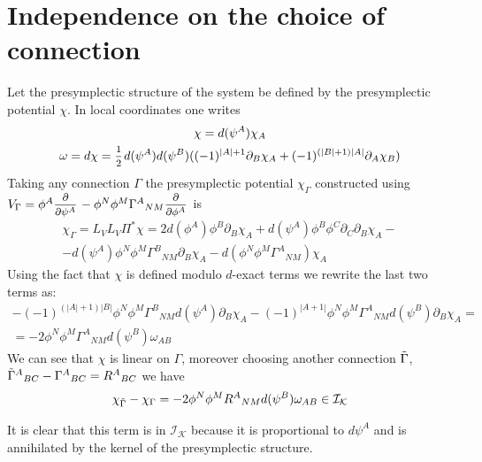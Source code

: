 \documentclass[a4paper,12pt]{article}
\numberwithin{equation}{section} %
\renewcommand{\d}{\partial}
\newcommand{\half}{\mathchoice{%
    \ffrac{1}{2}}{\frac{1}{2}}{\frac{1}{2}}{\frac{1}{2}}}
\newcommand{\ffrac}[2]{\raisebox{.5pt}%
  {\footnotesize$\displaystyle\frac{#1}{#2}$}\kern1pt}
\newcommand{\ddl}[2]{\ffrac{\d #1}{\d #2}}
\def\cI{\mathcal{I}}
\def\cK{\mathcal{K}}
\begin{document}
\section{Independence on the choice of connection}\label{App:Linearization}
Let the presymplectic structure of the system be defined by the presymplectic potential $\chi$. In local coordinates one writes 
\begin{equation}
\begin{gathered}
    \chi = d(\psi^A)\chi_A \\
    \omega = d\chi = \half d(\psi^A)d(\psi^B)((-1)^{|A|+1}\partial_B \chi_A + (-1)^{(|B|+1)|A|}\partial_A \chi_B)
\end{gathered}
\end{equation}
Taking any connection $\Gamma$ the presymplectic potential $\chi_{\Gamma}$ constructed using $V_\Gamma = \phi^A \ddl{}{\psi^A} - \phi^N \phi^M \Gamma^A{}_{NM}\ddl{}{\phi^A}$ is 
\begin{equation}
\begin{gathered}
    \chi_\Gamma = L_V L_V \Pi^* \chi = 2 d(\phi^A) \phi^B \partial_B\chi_A  + d(\psi^A) \phi^B \phi^C \partial_C \partial_B \chi_A  - \\ - d(\psi^A) \phi^N \phi^M \Gamma^B{}_{NM} \partial_B \chi_A - d(\phi^N \phi^M \Gamma^A{}_{NM}) \chi_A 
\end{gathered}
\end{equation}
Using the fact that $\chi$ is defined modulo $d$-exact terms we rewrite the last two terms as:
\begin{equation}
    \begin{gathered}
         -(-1)^{(|A|+1)|B|}\phi^N \phi^M \Gamma^B{}_{NM} d(\psi^A) \partial_B \chi_A -  (-1)^{|A+1|}\phi^N \phi^M \Gamma^A{}_{NM} d(\psi^B)\partial_B\chi_A = \\ = -2\phi^N \phi^M \Gamma^A{}_{NM} d(\psi^B) \omega_{AB}
    \end{gathered}
\end{equation}
We can see that $\chi$ is linear on $\Gamma$, moreover choosing another connection $\Tilde{\Gamma}$, $\Tilde{\Gamma}^A{}_{BC} - \Gamma^A{}_{BC} = R^A{ }_{BC}$ we have 
\begin{equation}
    \chi_{\Tilde{\Gamma}} - \chi_{\Gamma} = -2\phi^N \phi^M R^A{}_{NM} d(\psi^B) \omega_{AB} \in \cI_{\cK}
\end{equation}

It is clear that this term is in $\cI_{\cK}$ because it is proportional to $d\psi^A$ and is annihilated by the kernel of the presymplectic structure.
\end{document}
